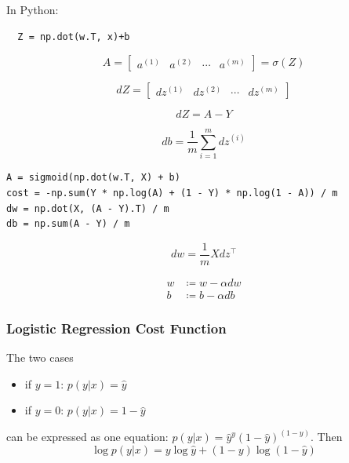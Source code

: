 \documentclass{article}
\begin{document}
In Python:
\begin{verbatim}
  Z = np.dot(w.T, x)+b
\end{verbatim}

\begin{equation}
  A=\begin{bmatrix}a^{(1)} & a^{(2)} & \cdots & a^{(m)}\end{bmatrix}=\sigma(Z)
\end{equation}

\begin{equation}
  dZ=\begin{bmatrix}dz^{(1)} & dz^{(2)} & \cdots & dz^{(m)}\end{bmatrix}
\end{equation}

\begin{equation}
  dZ=A-Y
\end{equation}

\begin{equation}
  db=\frac{1}{m}\sum_{i=1}^m dz^{(i)}
\end{equation}

\begin{verbatim}
A = sigmoid(np.dot(w.T, X) + b)
cost = -np.sum(Y * np.log(A) + (1 - Y) * np.log(1 - A)) / m
dw = np.dot(X, (A - Y).T) / m
db = np.sum(A - Y) / m
\end{verbatim}

\begin{equation}
  dw=\frac{1}{m}X dz^\top
\end{equation}

\begin{equation}
  \begin{split}
    w &\coloneqq w-\alpha dw\\
    b &\coloneqq b-\alpha db
  \end{split}
\end{equation}

\subsubsection{Logistic Regression Cost Function}
The two cases
\begin{itemize}
  \item if $y=1$: $p(y|x)=\hat{y}$
  \item if $y=0$: $p(y|x)=1-\hat{y}$
\end{itemize}
can be expressed as one equation: $p(y|x)=\hat{y}^y(1-\hat{y})^{(1-y)}$.
Then
\begin{equation}
  \log p(y|x)=y\log\hat{y}+(1-y)\log(1-\hat{y})
\end{equation}
\end{document}
